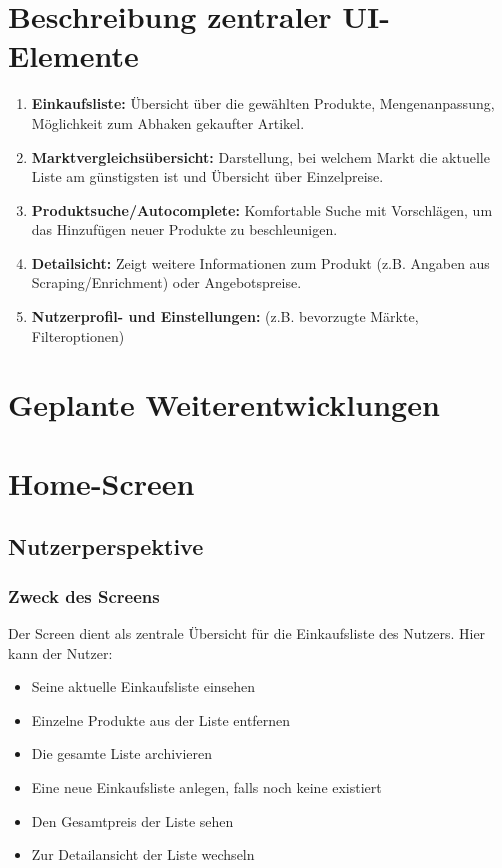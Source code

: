 \documentclass[12pt, a4paper]{report} %
\begin{document}
\section{Beschreibung zentraler UI-Elemente}
\begin{enumerate}
    \item \textbf{Einkaufsliste:} Übersicht über die gewählten Produkte, Mengenanpassung, Möglichkeit zum Abhaken gekaufter Artikel.
    \item \textbf{Marktvergleichsübersicht:} Darstellung, bei welchem Markt die aktuelle Liste am günstigsten ist und Übersicht über Einzelpreise.
    \item \textbf{Produktsuche/Autocomplete:} Komfortable Suche mit Vorschlägen, um das Hinzufügen neuer Produkte zu beschleunigen.
    \item \textbf{Detailsicht:} Zeigt weitere Informationen zum Produkt (z.B. Angaben aus Scraping/Enrichment) oder Angebotspreise.
    \item \textbf{Nutzerprofil- und Einstellungen:} (z.B. bevorzugte Märkte, Filteroptionen)
\end{enumerate}

\section{Geplante Weiterentwicklungen}

\section{Home-Screen}
\label{sec:home_screen}

\subsection{Nutzerperspektive}

\subsubsection{Zweck des Screens}
Der Screen dient als zentrale Übersicht für die Einkaufsliste des Nutzers. Hier kann der Nutzer:
\begin{itemize}
    \item Seine aktuelle Einkaufsliste einsehen
    \item Einzelne Produkte aus der Liste entfernen
    \item Die gesamte Liste archivieren
    \item Eine neue Einkaufsliste anlegen, falls noch keine existiert
    \item Den Gesamtpreis der Liste sehen
    \item Zur Detailansicht der Liste wechseln
\end{itemize}
\end{document}
